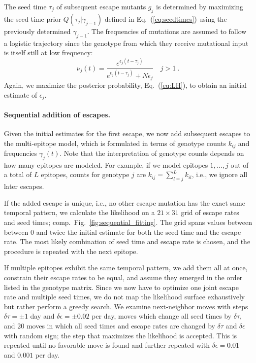 \documentclass{frontiers}
\newcommand{\EQ}[1]{Eq.~(\ref{eq:#1})}
\newcommand{\FIG}[1]{Fig.~\ref{fig:#1}}
\newcommand{\gt}{g}
\newcommand{\gtfreq}{\gamma}
\newcommand{\afreq}{\nu}
\newcommand{\fcoeff}{\epsilon}
\begin{document}
The seed time $\tau_j$ of subsequent escape mutants $\gt_j$ is determined by
maximizing the seed time prior $Q(\tau_j|\gtfreq_{j-1})$ defined in
\EQ{seedtimes} using the previously determined $\gtfreq_{j-1}$. 
The frequencies of mutations are assumed to follow a logistic trajectory since
the genotype from which they receive mutational input is itself still at low frequency:
\begin{equation}
\afreq_j(t) =\frac{e^{\fcoeff_j(t-\tau_j)}}{e^{\fcoeff_j(t-\tau_j)} +
N\fcoeff_j} \quad j>1 \ .
\end{equation}
Again, we maximize the posterior probability, \EQ{LH}, to obtain an initial estimate of
$\fcoeff_j$.


\paragraph*{Sequential addition of escapes.} 
Given the initial estimates for the first escape, we now add subsequent escapes
to the multi-epitope model, which is formulated in terms of genotype counts
$k_{ij}$ and frequencies $\gtfreq_j(t)$. Note that the interpretation of
genotype counts depends on how many epitopes are modeled. For example, if we
model epitopes $1,\ldots,j$ out of a total of $L$ epitopes, counts for genotype
$j$ are $k_{ij} = \sum_{l=j}^{L}k_{il}$, i.e., we ignore all later escapes. 

If the added escape is unique, i.e., no other escape mutation has the exact
same temporal pattern, we calculate the likelihood on a $21\times 31$ grid
of escape rates and seed times; comp.~\FIG{sequential_fitting}. The grid spans values between between 0 and twice the
initial estimate for both the seed time and the escape rate. 
The most likely combination of seed time and escape rate is
chosen, and the procedure is repeated with the next epitope.

If multiple epitopes exhibit the same temporal pattern, we add them all at once,
constrain their escape rates to be equal, and assume they emerged in the order
listed in the genotype matrix. Since we now have to optimize one joint escape
rate and multiple seed times, we do not map the likelihood surface
exhaustively but rather perform a greedy search. We examine next-neighbor moves with
steps $\delta \tau = \pm 1$ day and $\delta \fcoeff = \pm 0.02$ per day, moves
which change all seed times by $\delta \tau$, and 20 moves in which all seed times and
escape rates are changed by $\delta \tau$ and $\delta \fcoeff$ with random
sign; the step that maximizes the likelihood is accepted.
This is repeated until no favorable move is found and further repeated with 
$\delta \fcoeff = 0.01$ and $0.001$ per day.
\end{document}
